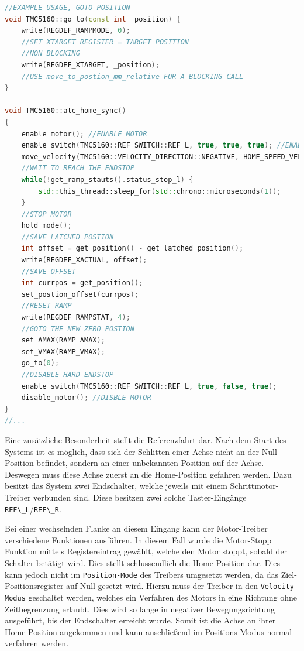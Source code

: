 \begin{lstlisting}[language={C++}]
//EXAMPLE USAGE, GOTO POSITION
void TMC5160::go_to(const int _position) {
    write(REGDEF_RAMPMODE, 0);
    //SET XTARGET REGISTER = TARGET POSITION
    //NON BLOCKING
    write(REGDEF_XTARGET, _position);
    //USE move_to_postion_mm_relative FOR A BLOCKING CALL
}

void TMC5160::atc_home_sync()
{    
    enable_motor(); //ENABLE MOTOR
    enable_switch(TMC5160::REF_SWITCH::REF_L, true, true, true); //ENABLE LIMIT SWICHT => ENABLE HARD ENDSTOP
    move_velocity(TMC5160::VELOCITY_DIRECTION::NEGATIVE, HOME_SPEED_VELOCITY, 1000); //MOVE NEGATIVE TO LIMIT SWITCH
    //WAIT TO REACH THE ENDSTOP
    while(!get_ramp_stauts().status_stop_l) {
        std::this_thread::sleep_for(std::chrono::microseconds(1));
    }
    //STOP MOTOR
    hold_mode();
    //SAVE LATCHED POSTION
    int offset = get_position() - get_latched_position();
    write(REGDEF_XACTUAL, offset);
    //SAVE OFFSET
    int currpos = get_position();
    set_postion_offset(currpos);
    //RESET RAMP
    write(REGDEF_RAMPSTAT, 4);
    //GOTO THE NEW ZERO POSTION
    set_AMAX(RAMP_AMAX);
    set_VMAX(RAMP_VMAX);
    go_to(0);
    //DISABLE HARD ENDSTOP 
    enable_switch(TMC5160::REF_SWITCH::REF_L, true, false, true);
    disable_motor(); //DISBLE MOTOR
}
//...
\end{lstlisting}

Eine zusätzliche Besonderheit stellt die Referenzfahrt dar. Nach dem
Start des Systems ist es möglich, dass sich der Schlitten einer Achse
nicht an der Null-Position befindet, sondern an einer unbekannten
Position auf der Achse. Deswegen muss diese Achse zuerst an die
Home-Position gefahren werden. Dazu besitzt das System zwei Endschalter,
welche jeweils mit einem Schrittmotor-Treiber verbunden sind. Diese
besitzen zwei solche Taster-Eingänge
\passthrough{\lstinline!REF\_L!}/\passthrough{\lstinline!REF\_R!}.

Bei einer wechselnden Flanke an diesem Eingang kann der Motor-Treiber
verschiedene Funktionen ausführen. In diesem Fall wurde die Motor-Stopp
Funktion mittels Registereintrag gewählt, welche den Motor stoppt,
sobald der Schalter betätigt wird. Dies stellt schlussendlich die
Home-Position dar. Dies kann jedoch nicht im
\passthrough{\lstinline!Position-Mode!} des Treibers umgesetzt werden,
da das Ziel-Positionsregister auf Null gesetzt wird. Hierzu muss der
Treiber in den \passthrough{\lstinline!Velocity-Modus!} geschaltet
werden, welches ein Verfahren des Motors in eine Richtung ohne
Zeitbegrenzung erlaubt. Dies wird so lange in negativer
Bewegungsrichtung ausgeführt, bis der Endschalter erreicht wurde. Somit
ist die Achse an ihrer Home-Position angekommen und kann anschließend im
Positions-Modus normal verfahren werden.

